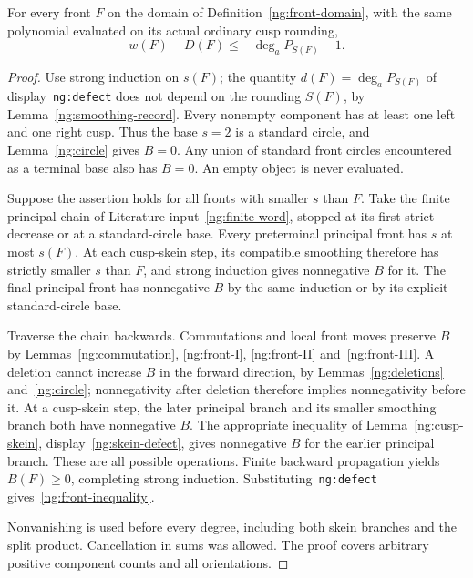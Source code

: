 \begin{theorem}
\label{ng:local-front-bound}\leanok
For every front $F$ on the domain of Definition~\ref{ng:front-domain},
with the same polynomial evaluated on its actual ordinary cusp rounding,
\begin{equation}\label{ng:front-inequality}
 w(F)-D(F)\leq-\deg_a P_{S(F)}-1.
\end{equation}

\end{theorem}
\begin{proof}\leanok{}
Use strong induction on $s(F)$; the quantity $d(F)=\deg_aP_{S(F)}$ of
display~\texttt{ng:defect} does not depend on the rounding $S(F)$, by
Lemma~\ref{ng:smoothing-record}. Every nonempty component has at least
one left and one right cusp. Thus the base $s=2$ is a standard circle,
and Lemma~\ref{ng:circle} gives $B=0$. Any union of standard front
circles encountered as a terminal base also has $B=0$. An empty object
is never evaluated.

Suppose the assertion holds for all fronts with smaller $s$ than $F$.
Take the finite principal chain of Literature input~\ref{ng:finite-word},
stopped at its first strict decrease or at a standard-circle base.
Every preterminal principal front has $s$ at most $s(F)$. At each
cusp-skein step, its compatible smoothing therefore has strictly smaller
$s$ than $F$, and strong induction gives nonnegative $B$ for it. The
final principal front has nonnegative $B$ by the same induction or by
its explicit standard-circle base.

Traverse the chain backwards. Commutations and local front moves
preserve $B$ by Lemmas~\ref{ng:commutation}, \ref{ng:front-I}, \ref{ng:front-II}
and~\ref{ng:front-III}.
A deletion cannot increase $B$ in the forward direction, by
Lemmas~\ref{ng:deletions} and~\ref{ng:circle}; nonnegativity after
deletion therefore implies nonnegativity before it. At a cusp-skein
step, the later principal branch and its smaller smoothing branch both
have nonnegative $B$. The appropriate inequality
of Lemma~\ref{ng:cusp-skein}, display~\eqref{ng:skein-defect}, gives nonnegative $B$ for the earlier
principal branch. These are all possible operations. Finite backward
propagation yields $B(F)\geq0$, completing strong induction.
Substituting~\texttt{ng:defect} gives~\eqref{ng:front-inequality}.

Nonvanishing is used before every degree, including both skein branches
and the split product. Cancellation in sums was allowed. The proof
covers arbitrary positive component counts and all orientations.
\end{proof}

